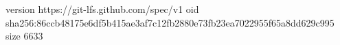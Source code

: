 version https://git-lfs.github.com/spec/v1
oid sha256:86ccb48175e6df5b415ae3af7c12fb2880e73fb23ea7022955f65a8dd629c995
size 6633
